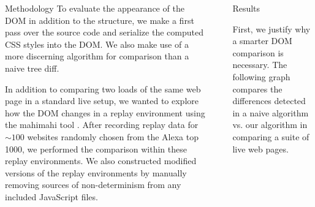 \documentclass[final]{beamer}
\newlength{\sepwid}
\newlength{\onecolwid}
\begin{document}
\begin{frame}[t]
\begin{columns}[t]
\begin{column}{\onecolwid}
\vspace{-0.5cm}
\begin{block}{Methodology}
To evaluate the appearance of the DOM in addition to the structure, we make a first pass over the source code and serialize the computed CSS styles into the DOM. We also make use of a more discerning algorithm for comparison than a naive tree diff. 

In addition to comparing two loads of the same web page in a standard live setup, we wanted to explore how the DOM changes in a replay environment using the mahimahi tool \cite{netravali_sivaraman_winstein_das_goyal_balakrishnan_2014}. After recording replay data for $\sim 100$ websites randomly chosen from the Alexa top 1000, we performed the comparison within these replay environments. We also constructed modified versions of the replay environments by manually removing sources of non-determinism from any included JavaScript files. 
\end{block}


\end{column} %

\begin{column}{\sepwid}\end{column} %

\begin{column}{\onecolwid} %


\begin{block}{Results}

First, we justify why a smarter DOM comparison is necessary. The following graph compares the differences detected in a naive algorithm vs. our algorithm in comparing a suite of live web pages.


\end{block}
\end{column}
\end{columns}
\end{frame}
\end{document}
